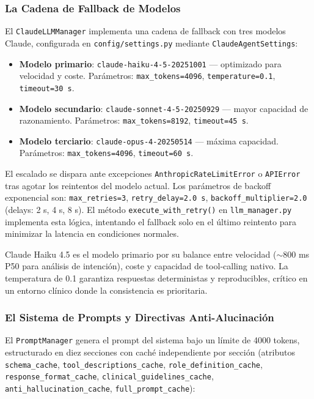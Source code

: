 \subsubsection{La Cadena de Fallback de Modelos}
\label{sec:fallback}

El \texttt{ClaudeLLMManager} implementa una cadena de fallback con tres modelos Claude, configurada en \texttt{config/settings.py} mediante \texttt{ClaudeAgentSettings}:

\begin{itemize}[nosep, leftmargin=*]
  \item \textbf{Modelo primario}: \texttt{claude-haiku-4-5-20251001} — optimizado para velocidad y coste. Parámetros: \texttt{max\_tokens=4096}, \texttt{temperature=0.1}, \texttt{timeout=30 s}.
  \item \textbf{Modelo secundario}: \texttt{claude-sonnet-4-5-20250929} — mayor capacidad de razonamiento. Parámetros: \texttt{max\_tokens=8192}, \texttt{timeout=45 s}.
  \item \textbf{Modelo terciario}: \texttt{claude-opus-4-20250514} — máxima capacidad. Parámetros: \texttt{max\_tokens=4096}, \texttt{timeout=60 s}.
\end{itemize}

El escalado se dispara ante excepciones \texttt{AnthropicRateLimitError} o \texttt{APIError} tras agotar los reintentos del modelo actual. Los parámetros de backoff exponencial son: \texttt{max\_retries=3}, \texttt{retry\_delay=2.0 s}, \texttt{backoff\_multiplier=2.0} (delays: 2 s, 4 s, 8 s). El método \texttt{execute\_with\_retry()} en \texttt{llm\_manager.py} implementa esta lógica, intentando el fallback solo en el último reintento para minimizar la latencia en condiciones normales.

Claude Haiku 4.5 es el modelo primario por su balance entre velocidad ($\sim$800 ms P50 para análisis de intención), coste y capacidad de tool-calling nativo. La temperatura de 0.1 garantiza respuestas deterministas y reproducibles, crítico en un entorno clínico donde la consistencia es prioritaria.

\subsubsection{El Sistema de Prompts y Directivas Anti-Alucinación}
\label{sec:antihallucination_37}

El \texttt{PromptManager} genera el prompt del sistema bajo un límite de 4000 tokens, estructurado en diez secciones con caché independiente por sección (atributos \texttt{schema\_cache}, \texttt{tool\_descriptions\_cache}, \texttt{role\_definition\_cache}, \texttt{response\_format\_cache}, \texttt{clinical\_guidelines\_cache}, \texttt{anti\_hallucination\_cache}, \texttt{full\_prompt\_cache}):


